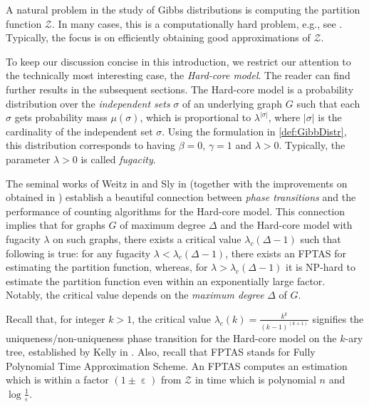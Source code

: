 \documentclass[11pt,reqno]{amsart}
\numberwithin{equation}{section}
\newcommand{\blue}[1]{{\color{blue}#1}}
\newcommand{\bluepigment}[1]{{\color{blue(pigment)}#1}}
\newcommand{\maxDeg}{{\Delta}}
\newcommand{\PartFun}{\mathcal{Z}}
\newcommand{\lcritical}{{\lambda_c}}
\newcommand{\abs}[1]{\blue{|}#1\blue{|}}
\renewcommand{\blue}[1]{#1}
\renewcommand{\bluepigment}[1]{#1}
\newcommand{\kk}{\bluepigment{k}}
\renewcommand{\kk}{k}
\begin{document}
A natural problem in the study of Gibbs distributions  is  computing  the partition function $\PartFun$.  
In many cases,  this is a  computationally hard problem, e.g., see \cite{Valiant79,JerSincIsing93}. Typically,  
the focus  is on efficiently  obtaining good approximations of $\PartFun$. 





To keep our discussion concise in this introduction, we restrict  our  attention to the technically most interesting 
case,  the  {\em Hard-core model}.  The reader can find further results in the subsequent sections. 
The Hard-core  model is a probability distribution over  the  {\em independent sets} $\sigma$ of an underlying graph $G$ such that each 
 $\sigma$  gets probability mass $\mu(\sigma)$,  which is proportional to $\lambda^{\abs{\sigma}}$, where $\abs{\sigma}$ 
is the cardinality of the independent  set $\sigma$. 
Using the  formulation in \eqref{def:GibbDistr}, this distribution corresponds to  having $\beta=0$, $\gamma=1$ and $\lambda>0$. 
Typically,  the parameter $\lambda>0$ is called  {\em fugacity}. 



The seminal works of Weitz in \cite{Weitz} and Sly in \cite{Sly10} (together with the improvements on \cite{Sly10} obtained in
\cite{SS14,GSV16Hardness}) establish a beautiful connection between {\em phase transitions} and the performance 
of counting algorithms for the Hard-core  model.    This connection implies that for graphs $G$ of maximum degree $\maxDeg$ 
and the  Hard-core model  with fugacity $\lambda$ on such graphs,  
there  exists a critical value $\lcritical(\maxDeg-1)$ such that following is true: for any fugacity $\lambda<\lcritical(\maxDeg-1)$, 
there exists an FPTAS for estimating the partition function, whereas, for 
$\lambda>\lcritical(\maxDeg-1)$ it is NP-hard to estimate the  partition function even within an exponentially large factor.  
%
Notably,  the critical value depends on the {\em maximum degree} $\maxDeg$ of  $G$.



Recall that, for integer $\kk>1$,   the critical value $\lcritical(\kk)=\frac{\kk^{\kk}}{(\kk-1)^{(\kk+1)}}$  signifies the  uniqueness/non-uniqueness
phase transition for the Hard-core model on  the $\kk$-ary  tree, established by Kelly in   \cite{Kelly85}.
Also, recall that FPTAS stands for  Fully Polynomial   Time Approximation Scheme.
 An FPTAS  computes an  estimation     which is within a factor  $(1\pm \upepsilon)$ from $\PartFun$
in time  which is polynomial   $n$ and $\log \frac{1}{\upepsilon}$.
\end{document}
